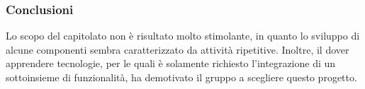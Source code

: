 \subsubsection{Conclusioni}
Lo scopo del capitolato non è risultato molto stimolante, in quanto lo
sviluppo di alcune componenti sembra caratterizzato da attività ripetitive.
Inoltre, il dover apprendere tecnologie, per le quali è solamente richiesto
l'integrazione di un sottoinsieme di funzionalità, ha demotivato il gruppo
a scegliere questo progetto.
